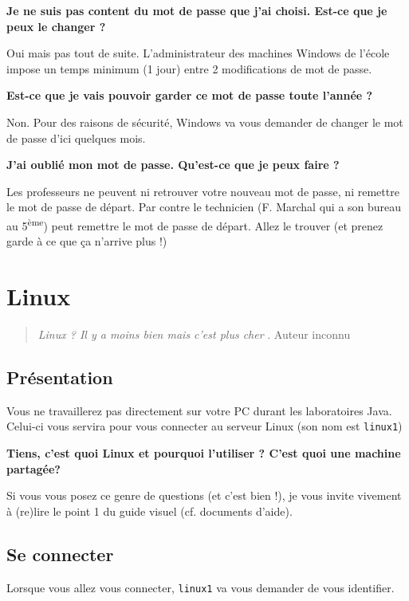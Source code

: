\documentclass[a4paper,11pt]{article}
\begin{document}
 \par
 \textbf{Je ne suis pas content du mot de passe que j'ai choisi. Est-ce que je peux le changer ?}
 \par
Oui mais pas tout de suite. L'administrateur des machines Windows de l'\'ecole impose un temps minimum (1 jour) entre 2 modifications de mot de passe.
 \par
 \textbf{Est-ce que je vais pouvoir garder ce mot de passe toute l'ann\'ee ?}
\par
Non. Pour des raisons de s\'ecurit\'e, Windows va vous demander de changer le mot de passe d'ici quelques mois.
\par
 \textbf{J'ai oubli\'e mon mot de passe. Qu'est-ce que je peux faire ?}
 \par
 Les professeurs ne peuvent ni retrouver votre nouveau mot de passe, ni remettre le mot de passe de d\'epart. Par contre le technicien (F. Marchal qui a son bureau au 5\textsuperscript{\`eme}) peut remettre le mot de passe de d\'epart. Allez le trouver (et prenez garde \`a ce que \c ca n'arrive plus !)
 \par

\clearpage
\section{Linux}
\begin{quotation}
\guillemotleft  \textit{Linux ? Il y a moins bien mais c'est plus cher} \guillemotright . Auteur inconnu
\end{quotation}
\subsection{Présentation}
Vous ne travaillerez pas directement sur votre PC durant les laboratoires Java. Celui-ci vous servira pour vous connecter au serveur Linux (son nom est \verb_linux1_)
 \par
 \textbf{Tiens, c'est quoi Linux et pourquoi l'utiliser ? C'est quoi une machine partag\'ee?}
 \par
  Si vous vous posez ce genre de questions (et c'est bien !), je vous invite vivement \`a (re)lire le point 1 du guide visuel (cf. documents d'aide).
 \par
\subsection{Se connecter}
Lorsque vous allez vous connecter, \verb_linux1_ va vous demander de vous identifier.
				
\end{document}
